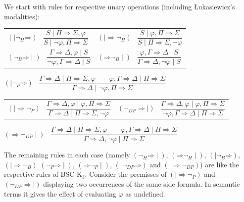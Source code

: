 \documentclass[10pt,a4paper]{article}
\theoremstyle{definition}
\newcommand{\3}{\vspace{.3in}}
\newcommand{\2}{\vspace{.2in}}
\newcommand{\1}{\vspace{.1in}}
\newcommand{\5}{\vspace{.05in}}
\begin{document}
We start with rules for respective unary operations (including \L u\-ka\-sie\-wicz's modalities):



\1

\noindent\begin{tabular}{ll}

	$(\mathord{\mid\neg_H}\mathord{\Rightarrow})$ \ $\dfrac{S \mid \Pi\Rightarrow\Sigma, \varphi}{S \mid \neg\varphi, \Pi\Rightarrow\Sigma}$ &
	$(\mathord{\mid\Rightarrow}\mathord{\neg_H})$ \ $\dfrac{S \mid \varphi, \Pi\Rightarrow\Sigma}{S \mid \Pi\Rightarrow\Sigma, \neg\varphi}$\\[16pt]
	
	
	$(\mathord{\neg_B}\mathord{\Rightarrow}\mid)$ \ $\dfrac{\Gamma
		\Rightarrow \Delta, \varphi \mid S}{\neg \varphi, \Gamma \Rightarrow \Delta \mid S}$ &
	$(\mathord{\Rightarrow}\mathord{\neg_B}\mid)$ \ $\dfrac{\varphi, \Gamma
		\Rightarrow \Delta \mid S}{\Gamma
		\Rightarrow \Delta, \neg\varphi\mid S}$\\[16pt]
	
\end{tabular}	

$(\mathord{\mid\neg_P}\mathord{\Rightarrow})$ \ $\dfrac{\Gamma
	\Rightarrow \Delta \mid \Pi\Rightarrow\Sigma, \varphi \qquad \varphi, \Gamma\Rightarrow\Delta \mid \Pi\Rightarrow\Sigma}{\Gamma \Rightarrow \Delta \mid \neg\varphi, \Pi\Rightarrow\Sigma}$ 

\1

\noindent\begin{tabular}{ll}
	
	
	$(\mathord{\mid\Rightarrow}\mathord{\neg_P})$ \ $\dfrac{\Gamma
		\Rightarrow \Delta, \varphi \mid \varphi, \Pi\Rightarrow\Sigma}{\Gamma
		\Rightarrow \Delta \mid \Pi\Rightarrow\Sigma, \neg\varphi}$ &
	$(\mathord{\neg_{DP}}\mathord{\Rightarrow\mid})$ \ $\dfrac{\Gamma
		\Rightarrow \Delta, \varphi \mid \varphi, \Pi\Rightarrow\Sigma}{\neg\varphi, \Gamma
		\Rightarrow \Delta \mid \Pi\Rightarrow\Sigma}$
	
\end{tabular}	

\1

$(\mathord{\Rightarrow\neg_{DP}\mid})$ \ $\dfrac{\Gamma
	\Rightarrow \Delta \mid \Pi\Rightarrow\Sigma, \varphi \qquad \varphi, \Gamma\Rightarrow\Delta \mid \Pi\Rightarrow\Sigma}{\Gamma \Rightarrow \Delta, \neg\varphi \mid \Pi\Rightarrow\Sigma}$ 


\1

The remaining rules in each case (namely $(\mathord{\neg_H}\mathord{\Rightarrow}\!\mid)$, $(\mathord{\Rightarrow}\mathord{\neg_H}\!\mid)$, $(\mathord{\mid\!\neg_B}\mathord{\Rightarrow})$, $(\mathord{\mid\Rightarrow}\mathord{\neg_B})$ $(\mathord{\neg_P}\mathord{\Rightarrow}\mid)$, $(\mathord{\Rightarrow}\mathord{\neg_P}\mid)$, $(\mathord{\mid\neg_{DP}}\mathord{\Rightarrow})$ and $(\mathord{\mid\Rightarrow}\mathord{\neg_{DP}})$) are like the respective rules of
BSC-K$_3$. Consider the premisses of $(\mathord{\mid\Rightarrow}\mathord{\neg_P})$ and $(\mathord{\neg_{DP}}\mathord{\Rightarrow\mid})$ displaying two occurrences of the same side formula. In semantic terms it gives the effect of evaluating $\varphi$ as undefined.
\end{document}
